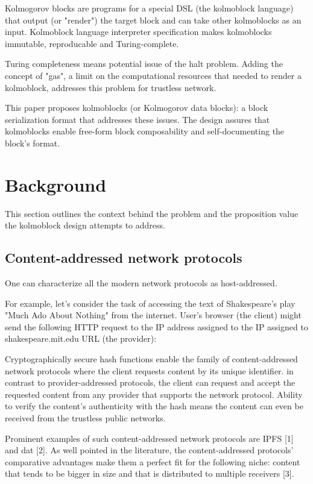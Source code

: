 \documentclass[twocolumn,aps,pra,floatfix]{revtex4-1}
\begin{document}
Kolmogorov blocks are programs for a special DSL (the kolmoblock language) that output (or "render") the target block and can take other kolmoblocks as an input. Kolmoblock language interpreter specification makes kolmoblocks immutable, reproducable and Turing-complete.   

Turing completeness means potential issue of the halt problem. Adding the concept of "gas", a limit on the computational resources that needed to render a kolmoblock, addresses this problem for trustless network.    


This paper proposes kolmoblocks (or Kolmogorov data blocks): a block serialization format that addresses these issues. The design assures that kolmoblocks enable free-form block composability and self-documenting the block's format.

\section{Background}
This section outlines the context behind the problem and the proposition value the kolmoblock design attempts to address.

\subsection{Content-addressed network protocols}

One can characterize all the modern network protocols as host-addressed.
 
For example, let's consider the task of accessing the text of Shakespeare's play "Much Ado About Nothing" from the internet. User's browser (the client) might send the following HTTP request to the IP address assigned to the IP assigned to shakespeare.mit.edu URL (the provider):

Cryptographically secure hash functions enable the family of content-addressed network protocols where the client requests content by its unique identifier. in contrast to provider-addressed protocols, the client can request and accept the requested content from any provider that supports the network protocol. Ability to verify the content's authenticity with the hash means the content can even be received from the trustless public networks.

Prominent examples of such content-addressed network protocols are IPFS [1] and dat [2]. 
As well pointed in the literature, the content-addressed protocols' comparative advantages make them a perfect fit for the following niche: content that tends to be bigger in size and that is distributed to multiple receivers [3].   
\end{document}
